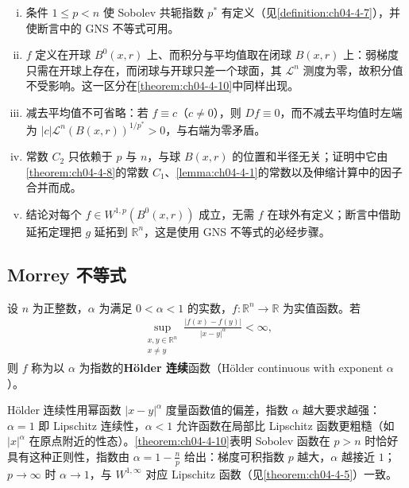 \documentclass[../../main.tex]{subfiles}%
\begin{document}
\begin{remark}\label{remark:ch04-thm-4-9-条件}
\begin{enumerate}[(i)]
\item 条件 $1\leqslant p<n$ 使 Sobolev 共轭指数 $p^*$ 有定义（见\cref{definition:ch04-4-7}），并使断言中的 GNS 不等式可用。%
\item $f$ 定义在开球 $B^{0}(x,r)$ 上、而积分与平均值取在闭球 $B(x,r)$ 上：弱梯度只需在开球上存在，而闭球与开球只差一个球面，其 $\mathcal{L}^{n}$ 测度为零，故积分值不受影响。这一区分在\cref{theorem:ch04-4-10}中同样出现。%
\item 减去平均值不可省略：若 $f\equiv c$（$c\neq0$），则 $Df\equiv0$，而不减去平均值时左端为 $\lvert c\rvert\mathcal{L}^{n}(B(x,r))^{1/p^*}>0$，与右端为零矛盾。
\item 常数 $C_2$ 只依赖于 $p$ 与 $n$，与球 $B(x,r)$ 的位置和半径无关；证明中它由\cref{theorem:ch04-4-8}的常数 $C_1$、\cref{lemma:ch04-4-1}的常数以及伸缩计算中的因子合并而成。%
\item 结论对每个 $f\in W^{1,p}(B^{0}(x,r))$ 成立，无需 $f$ 在球外有定义；断言中借助延拓定理把 $g$ 延拓到 $\mathbb{R}^n$，这是使用 GNS 不等式的必经步骤。%
\end{enumerate}
\end{remark}


\subsection{Morrey 不等式}\label{subsection:ch04-05-3}

\begin{definition}\label{definition:ch04-4-8}
设 $n$ 为正整数，$\alpha$ 为满足 $0<\alpha<1$ 的实数，$f:\mathbb{R}^n\to\mathbb{R}$ 为实值函数。若
\begin{align*}
\sup_{\substack{x,y\in\mathbb{R}^n\\x\neq y}}\frac{\lvert f(x)-f(y)\rvert}{\lvert x-y\rvert^{\alpha}}<\infty,
\end{align*}
则 $f$ 称为以 $\alpha$ 为指数的\textbf{Hölder 连续}函数（Hölder continuous with exponent $\alpha$）。
\end{definition}

\begin{remark}\label{remark:ch04-def-4-8-动机}
Hölder 连续性用幂函数 $\lvert x-y\rvert^{\alpha}$ 度量函数值的偏差，指数 $\alpha$ 越大要求越强：$\alpha=1$ 即 Lipschitz 连续性，$\alpha<1$ 允许函数在局部比 Lipschitz 函数更粗糙（如 $\lvert x\rvert^{\alpha}$ 在原点附近的性态）。\cref{theorem:ch04-4-10}表明 Sobolev 函数在 $p>n$ 时恰好具有这种正则性，指数由 $\alpha=1-\frac{n}{p}$ 给出：梯度可积指数 $p$ 越大，$\alpha$ 越接近 $1$；$p\to\infty$ 时 $\alpha\to1$，与 $W^{1,\infty}$ 对应 Lipschitz 函数（见\cref{theorem:ch04-4-5}）一致。%
\end{remark}
\end{document}
